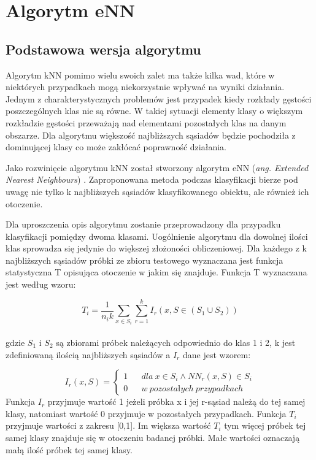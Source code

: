\chapter{Algorytm eNN}
\label{chap:enn}
\section{Podstawowa wersja algorytmu}
\large{Algorytm kNN pomimo wielu swoich zalet ma także kilka wad, które w niektórych przypadkach mogą niekorzystnie wpływać na wyniki działania. Jednym z charakterystycznych problemów jest przypadek kiedy rozkłady gęstości poszczególnych klas nie są równe. W takiej sytuacji elementy klasy o większym rozkładzie gęstości przeważają nad elementami pozostałych klas na danym obszarze. Dla algorytmu większość najbliższych sąsiadów będzie pochodziła z dominującej klasy co może zakłócać poprawność działania.

Jako rozwinięcie algorytmu kNN został stworzony algorytm eNN (\textit{ang. Extended Nearest Neighbours}) \cite{haibo-he}. Zaproponowana metoda podczas klasyfikacji bierze pod uwagę nie tylko k najbliższych sąsiadów klasyfikowanego obiektu, ale również ich otoczenie. 

Dla uproszczenia opis algorytmu zostanie przeprowadzony dla przypadku klasyfikacji pomiędzy dwoma klasami. Uogólnienie algorytmu dla dowolnej ilości klas sprowadza się jedynie do większej złożoności obliczeniowej. Dla każdego z k najbliższych sąsiadów próbki ze zbioru testowego wyznaczana jest funkcja statystyczna T opisująca otoczenie w jakim się znajduje. Funkcja T wyznaczana jest według wzoru:

\begin{equation}
T_{i} = \frac{1}{n_i k} {\sum_{x \in S_i} \sum_{r=1}^{k} I_r (x,S \in (S_1 \cup S_2))} 
\end{equation}\\
gdzie $S_1$ i $S_2$ są zbiorami próbek należących odpowiednio do klas 1 i 2, k jest zdefiniowaną ilością najbliższych sąsiadów a $I_r$ dane jest wzorem:

\begin{equation}
I_r(x,S) =\left\{\begin{matrix}
1 &&	dla\ x \in S_i \wedge NN_{r}(x,S) \in S_i
\\
0 &&	w\ pozostałych\ przypadkach
\end{matrix}\right.
\end{equation}
Funkcja $I_r$ przyjmuje wartość 1 jeżeli próbka x i jej r-sąsiad należą do tej samej klasy, natomiast wartość 0 przyjmuje w pozostałych przypadkach.
Funkcja $T_i$ przyjmuje wartości z zakresu [0,1]. Im większa wartość $T_i$ tym więcej próbek tej samej klasy znajduje się w otoczeniu badanej próbki. Małe wartości oznaczają małą ilość próbek tej samej klasy.

}
